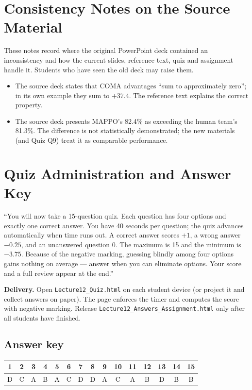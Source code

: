 \documentclass[11pt]{article}
\begin{document}
\section{Consistency Notes on the Source Material}These notes record where the original PowerPoint deck contained an inconsistency and how the current slides, reference text, quiz and assignment handle it. Students who have seen the old deck may raise them.\begin{itemize}\item The source deck states that COMA advantages ``sum to approximately zero''; in its own example they sum to $+37.4$. The reference text explains the correct property.\item The source deck presents MAPPO's 82.4\% as exceeding the human team's 81.3\%. The difference is not statistically demonstrated; the new materials (and Quiz Q9) treat it as comparable performance.\end{itemize}

\section{Quiz Administration and Answer Key}

\begin{sayit}``You will now take a 15-question quiz. Each question has four options and exactly one correct answer. You have 40 seconds per question; the quiz advances automatically when time runs out. A correct answer scores $+1$, a wrong answer $-0.25$, and an unanswered question 0. The maximum is 15 and the minimum is $-3.75$. Because of the negative marking, guessing blindly among four options gains nothing on average --- answer when you can eliminate options. Your score and a full review appear at the end.''\end{sayit}

\textbf{Delivery.} Open \texttt{Lecture12\_Quiz.html} on each student device (or project it and collect answers on paper). The page enforces the timer and computes the score with negative marking. Release \texttt{Lecture12\_Answers\_Assignment.html} only after all students have finished.

\subsection*{Answer key}\begin{center}\small\renewcommand{\arraystretch}{1.3}\begin{tabular}{|c|c|c|c|c|c|c|c|c|c|c|c|c|c|c|}\hline \textbf{1} & \textbf{2} & \textbf{3} & \textbf{4} & \textbf{5} & \textbf{6} & \textbf{7} & \textbf{8} & \textbf{9} & \textbf{10} & \textbf{11} & \textbf{12} & \textbf{13} & \textbf{14} & \textbf{15}\\\hline D & C & A & B & A & C & D & D & A & C & A & B & D & B & B\\\hline\end{tabular}\end{center}
\end{document}
